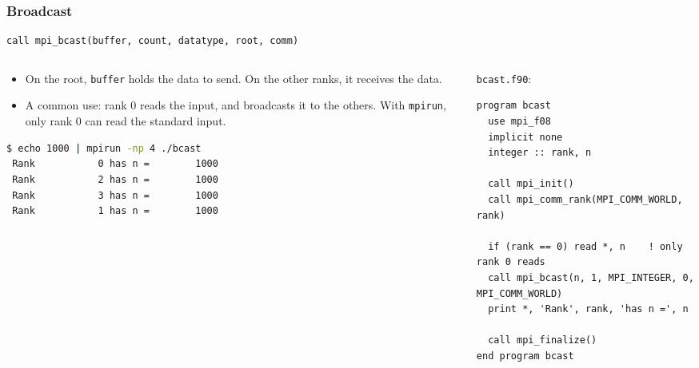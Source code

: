 \begin{frame}[fragile]
  \frametitle{Broadcast}
\begin{lstlisting}
call mpi_bcast(buffer, count, datatype, root, comm)
\end{lstlisting}
  \begin{columns}[T]
    \begin{column}{0.45\textwidth}
      \begin{itemize}
        \item On the root, \texttt{buffer} holds the data to send. On the other ranks, it receives the data.
        \item A common use: rank 0 reads the input, and broadcasts it to the others. With \texttt{mpirun}, only rank 0 can read the standard input.
      \end{itemize}

\begin{lstlisting}[language=bash]
$ echo 1000 | mpirun -np 4 ./bcast
 Rank           0 has n =        1000
 Rank           2 has n =        1000
 Rank           3 has n =        1000
 Rank           1 has n =        1000
\end{lstlisting}
    \end{column}

    \begin{column}{0.55\textwidth}
      \texttt{bcast.f90}:
\begin{lstlisting}
program bcast
  use mpi_f08
  implicit none
  integer :: rank, n

  call mpi_init()
  call mpi_comm_rank(MPI_COMM_WORLD, rank)

  if (rank == 0) read *, n    ! only rank 0 reads
  call mpi_bcast(n, 1, MPI_INTEGER, 0, MPI_COMM_WORLD)
  print *, 'Rank', rank, 'has n =', n

  call mpi_finalize()
end program bcast
\end{lstlisting}
    \end{column}
  \end{columns}
\end{frame}



